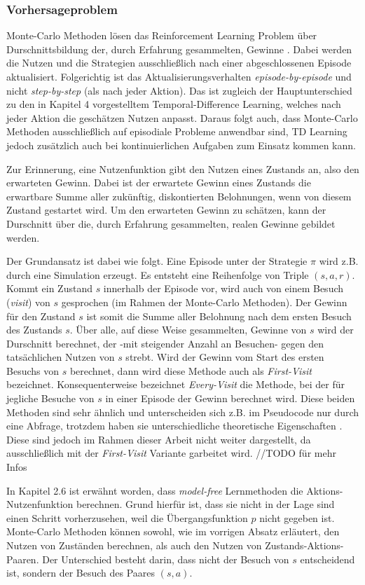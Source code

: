 \subsubsection{Vorhersageproblem}
Monte-Carlo Methoden lösen das Reinforcement Learning Problem über Durschnittsbildung der, durch Erfahrung gesammelten, Gewinne \cite[S.~91]{Sutton1998}. Dabei werden die Nutzen und die Strategien ausschließlich nach einer abgeschlossenen Episode aktualisiert. Folgerichtig ist das Aktualisierungsverhalten \textit{episode-by-episode} und nicht \textit{step-by-step} (als nach jeder Aktion)\cite[S.~91]{Sutton1998}. Das ist zugleich der Hauptunterschied zu den in Kapitel 4 vorgestelltem Temporal-Difference Learning, welches nach jeder Aktion die geschätzen Nutzen anpasst. Daraus folgt auch, dass Monte-Carlo Methoden ausschließlich auf episodiale Probleme anwendbar sind, TD Learning jedoch zusätzlich auch bei kontinuierlichen Aufgaben zum Einsatz kommen kann. 
\par
Zur Erinnerung, eine Nutzenfunktion gibt den Nutzen eines Zustands an, also den erwarteten Gewinn. Dabei ist der erwartete Gewinn eines Zustands die erwartbare Summe aller zukünftig, diskontierten Belohnungen, wenn von diesem Zustand gestartet wird. Um den erwarteten Gewinn zu schätzen, kann der Durschnitt über die, durch Erfahrung gesammelten, realen Gewinne gebildet werden.
\par 
Der Grundansatz ist dabei wie folgt. Eine Episode unter der Strategie $\pi$ wird z.B. durch eine Simulation erzeugt. Es entsteht eine Reihenfolge von Triple $(s,a,r)$. Kommt ein Zustand $s$ innerhalb der Episode vor, wird auch von einem Besuch (\textit{visit}) von $s$ gesprochen (im Rahmen der Monte-Carlo Methoden). Der Gewinn für den Zustand $s$ ist somit die Summe aller Belohnung nach dem ersten Besuch des Zustands $s$. Über alle, auf diese Weise gesammelten, Gewinne von $s$ wird der Durschnitt berechnet, der -mit steigender Anzahl an Besuchen- gegen den tatsächlichen Nutzen von $s$ strebt. Wird der Gewinn vom Start des ersten Besuchs von $s$ berechnet, dann wird diese Methode auch als \textit{First-Visit} bezeichnet. Konsequenterweise bezeichnet \textit{Every-Visit} die Methode, bei der für jegliche Besuche von $s$ in einer Episode der Gewinn berechnet wird. Diese beiden Methoden sind sehr ähnlich und unterscheiden sich z.B. im Pseudocode nur durch eine Abfrage, trotzdem haben sie unterschiedliche theoretische Eigenschaften \cite[S.~92]{Sutton1998}. Diese sind jedoch im Rahmen dieser Arbeit nicht weiter dargestellt, da ausschließlich mit der \textit{First-Visit} Variante garbeitet wird. //TODO für mehr Infos
\par 
In Kapitel 2.6 ist erwähnt worden, dass \textit{model-free} Lernmethoden die Aktions-Nutzenfunktion berechnen. Grund hierfür ist, dass sie nicht in der Lage sind einen Schritt vorherzusehen, weil die Übergangsfunktion $p$ nicht gegeben ist. Monte-Carlo Methoden können sowohl, wie im vorrigen Absatz erläutert, den Nutzen von Zuständen berechnen, als auch den Nutzen von Zustands-Aktions-Paaren. Der Unterschied besteht darin, dass nicht der Besuch von $s$ entscheidend ist, sondern der Besuch des Paares $(s,a)$.

